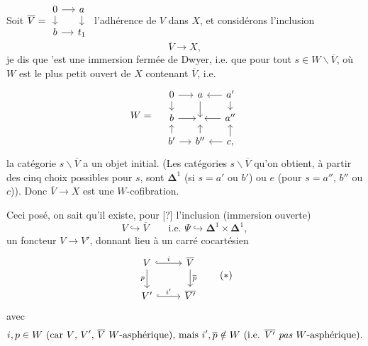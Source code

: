 \documentclass[11pt]{article}
\newcommand{\msp}[1]{\marginpar{\footnotesize [#1]}}
\begin{document}
Soit $\overline{V} = \vcenter{\hbox{\begin{tikzcd}[row sep=small, column sep=small]
0 \arrow[r] \arrow[d] & a \arrow[d] \\
b \arrow[r] & t_1
\end{tikzcd}}}$ l'adhérence de $V$ dans $X$,
\msp{page 14}et considérons l'inclusion
\[ \overline{V} \longrightarrow X, \]
je dis que 'est une immersion fermée de Dwyer, i.e. que pour tout $s \in W\backslash\overline{V}$, où $W$ est le plus petit ouvert de $X$ contenant $\overline{V}$, i.e.
\[
W = \quad
\begin{tikzcd}[row sep=small, column sep=small]
0 \arrow[r] \arrow[d] & a \arrow[d] & a' \arrow[l] \arrow[d] \\
b \arrow[r] & {} & a'' \arrow[l] \\
b' \arrow[u] \arrow[r] & b'' \arrow[u] & c, \arrow[l] \arrow[u]
\end{tikzcd}
\]
la catégorie $s\backslash\overline{V}$ a un objet initial. (Les catégories $s\backslash\overline{V}$ qu'on obtient, à partir des cinq choix possibles pour $s$, sont $\boldsymbol{\Delta}^1$ (si $s = a'$ ou $b'$) ou $e$ (pour $s = a''$, $b''$ ou $c$)). Donc $\overline{V} \longrightarrow X$ est une $W$-cofibration.

Ceci posé, on sait qu'il existe, pour [?] l'inclusion (immersion ouverte)
\[ V \hookrightarrow \overline{V} \qquad \text{i.e. } \Psi \hookrightarrow \boldsymbol{\Delta}^1 \times \boldsymbol{\Delta}^1, \]
un foncteur $V \longrightarrow V'$, donnant lieu à un carré cocartésien
\[
\begin{tikzcd}
V \arrow[r, hook, "i"] \arrow[d, "p"'] & \overline{V} \arrow[d, "\overline{p}"] \\
V' \arrow[r, hook, "i'"] & \overline{V'}
\end{tikzcd}
\tag*{$(*)$}
\]
avec
\[ i, p \in W \ \text{(car $V$, $V'$, $\overline{V}$ $W$-asphérique), mais } i', \overline{p} \notin W \ \text{(i.e. $\overline{V'}$ \textit{pas} $W$-asphérique).} \]
\end{document}
